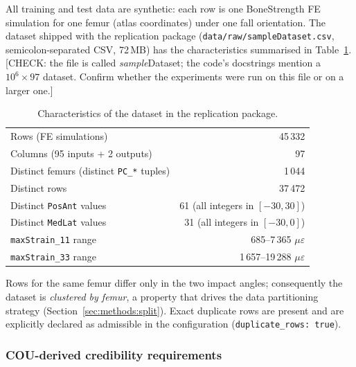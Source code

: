 All training and test data are synthetic: each row is one BoneStrength FE
simulation for one femur (atlas coordinates) under one fall orientation.
The dataset shipped with the replication package
(\texttt{data/raw/sampleDataset.csv}, semicolon-separated CSV, 72\,MB) has the
characteristics summarised in Table~\ref{tab:dataset}.
[CHECK: the file is called \emph{sample}Dataset; the code's docstrings mention
a $10^6 \times 97$ dataset. Confirm whether the experiments were run on this
file or on a larger one.]

\begin{table}[htbp]
  \centering
  \caption{Characteristics of the dataset in the replication package.}
  \label{tab:dataset}
  \begin{tabular}{lr}
    \toprule
    Rows (FE simulations)                          & 45\,332 \\
    Columns (95 inputs + 2 outputs)                & 97 \\
    Distinct femurs (distinct \texttt{PC\_*} tuples) & 1\,044 \\
    Distinct rows                                  & 37\,472 \\
    Distinct \texttt{PosAnt} values                & 61 (all integers in $[-30,30]$) \\
    Distinct \texttt{MedLat} values                & 31 (all integers in $[-30,0]$) \\
    \texttt{maxStrain\_11} range                   & 685--7\,365 $\mu\varepsilon$ \\
    \texttt{maxStrain\_33} range                   & 1\,657--19\,288 $\mu\varepsilon$ \\
    \bottomrule
  \end{tabular}
\end{table}

Rows for the same femur differ only in the two impact angles; consequently
the dataset is \emph{clustered by femur}, a property that drives the data
partitioning strategy (Section~\ref{sec:methods:split}). Exact duplicate rows
are present and are explicitly declared as admissible in the configuration
(\texttt{duplicate\_rows: true}).

\subsubsection{COU-derived credibility requirements}
\label{sec:methods:cou}

